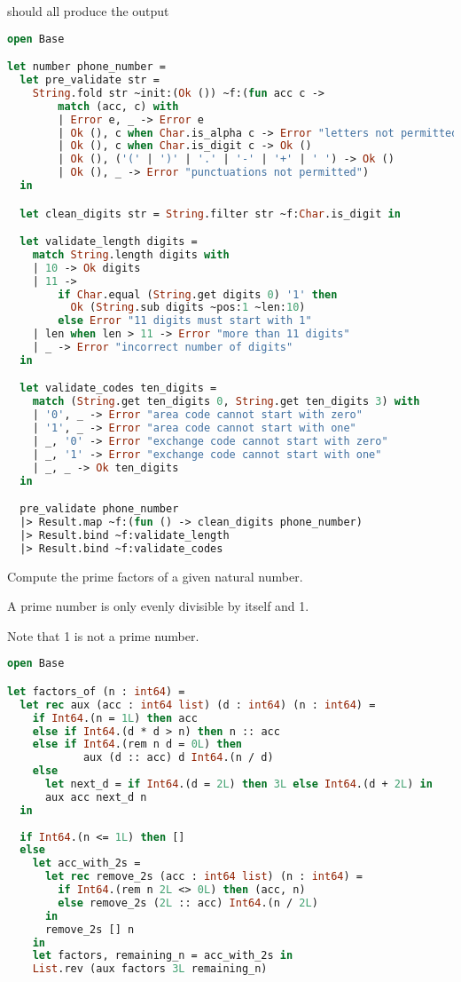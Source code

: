 should all produce the output


\begin{lstlisting}[language=OCaml]
open Base

let number phone_number =
  let pre_validate str =
    String.fold str ~init:(Ok ()) ~f:(fun acc c ->
        match (acc, c) with
        | Error e, _ -> Error e
        | Ok (), c when Char.is_alpha c -> Error "letters not permitted"
        | Ok (), c when Char.is_digit c -> Ok ()
        | Ok (), ('(' | ')' | '.' | '-' | '+' | ' ') -> Ok ()
        | Ok (), _ -> Error "punctuations not permitted")
  in

  let clean_digits str = String.filter str ~f:Char.is_digit in

  let validate_length digits =
    match String.length digits with
    | 10 -> Ok digits
    | 11 ->
        if Char.equal (String.get digits 0) '1' then
          Ok (String.sub digits ~pos:1 ~len:10)
        else Error "11 digits must start with 1"
    | len when len > 11 -> Error "more than 11 digits"
    | _ -> Error "incorrect number of digits"
  in

  let validate_codes ten_digits =
    match (String.get ten_digits 0, String.get ten_digits 3) with
    | '0', _ -> Error "area code cannot start with zero"
    | '1', _ -> Error "area code cannot start with one"
    | _, '0' -> Error "exchange code cannot start with zero"
    | _, '1' -> Error "exchange code cannot start with one"
    | _, _ -> Ok ten_digits
  in

  pre_validate phone_number
  |> Result.map ~f:(fun () -> clean_digits phone_number)
  |> Result.bind ~f:validate_length
  |> Result.bind ~f:validate_codes
\end{lstlisting}

Compute the prime factors of a given natural number.

A prime number is only evenly divisible by itself and 1.

Note that 1 is not a prime number.

\begin{lstlisting}[language=OCaml]
open Base

let factors_of (n : int64) =
  let rec aux (acc : int64 list) (d : int64) (n : int64) =
    if Int64.(n = 1L) then acc
    else if Int64.(d * d > n) then n :: acc
    else if Int64.(rem n d = 0L) then
            aux (d :: acc) d Int64.(n / d)
    else
      let next_d = if Int64.(d = 2L) then 3L else Int64.(d + 2L) in
      aux acc next_d n
  in
  
  if Int64.(n <= 1L) then []
  else
    let acc_with_2s =
      let rec remove_2s (acc : int64 list) (n : int64) =
        if Int64.(rem n 2L <> 0L) then (acc, n)
        else remove_2s (2L :: acc) Int64.(n / 2L)
      in
      remove_2s [] n
    in
    let factors, remaining_n = acc_with_2s in
    List.rev (aux factors 3L remaining_n)
\end{lstlisting}

